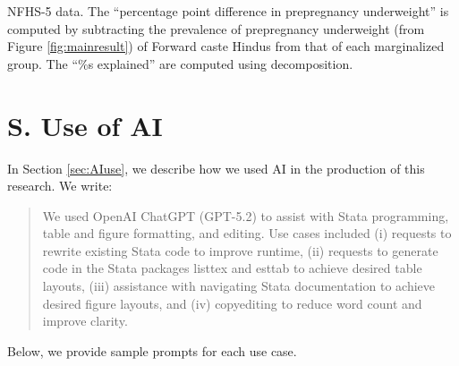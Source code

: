 \documentclass[12pt]{article}
\begin{document}
\begin{landscape}
    


\begin{table}[H]
    \centering

    \begin{threeparttable}
        
    
    \small %
    \caption{: Decomposition of social group differences in the prevalence of prepregnancy underweight using protein categories}
    \label{tab:protein_decomposition}
    \renewcommand{\arraystretch}{1.5}
    {}

    \begin{tablenotes}
        \item NFHS-5 data.  The ``percentage point difference in prepregnancy underweight'' is computed by subtracting the prevalence of prepregnancy underweight (from Figure \ref{fig:mainresult}) of Forward caste Hindus from that of each marginalized group. The ``\%s explained'' are computed using \cite{kitagawa1955components} decomposition. 
    \end{tablenotes} 

    \end{threeparttable}
\end{table}

\end{landscape}


\section{S. Use of AI} \label{sec:aiprompts}
In Section \ref{sec:AIuse}, we describe how we used AI in the production of this research.  We write:

\begin{quote}
We used OpenAI ChatGPT (GPT-5.2) to assist with Stata programming, table and figure formatting, and editing. Use cases included (i) requests to rewrite existing Stata code to improve runtime, (ii) requests to generate code in the Stata packages listtex and esttab to achieve desired table layouts, (iii) assistance with navigating Stata documentation to achieve desired figure layouts, and (iv) copyediting to reduce word count and improve clarity.
\end{quote}

Below, we provide sample prompts for each use case.
\end{document}

